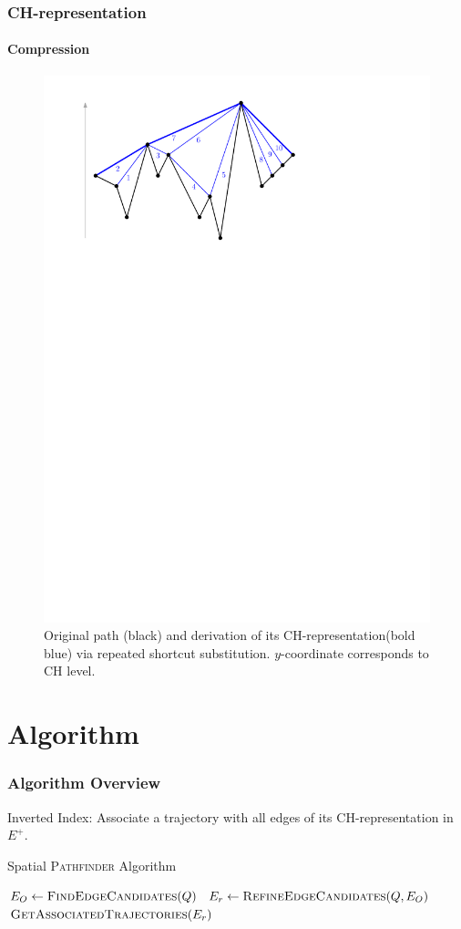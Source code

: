 \documentclass[10pt, t,
aspectratio=169,%
]{beamer}
\newcommand{\pathfinder}{\textsc{Pathfinder}\xspace}
\newcommand{\findEdgeCandidates}{FindEdgeCandidates\xspace}
\newcommand{\refineEdgeCandidates}{RefineEdgeCandidates\xspace}
\newcommand{\getAssociatedTrajectories}{GetAssociatedTrajectories\xspace}
\newcommand{\chrep}{CH-representation\xspace}
\begin{document}
\begin{frame}
	\frametitle{\chrep}
	\framesubtitle{Compression}
	\begin{figure}
		\caption{Original path (black) and derivation of its \chrep (bold blue) via repeated shortcut substitution. $y$-coordinate corresponds to CH level.}
		\includegraphics[width=.76\columnwidth]{images/toch}
	\end{figure}
\end{frame}

\section{Algorithm}

\begin{frame}
	\frametitle{Algorithm Overview}
	Inverted Index: Associate a trajectory with all edges of its \chrep in $E^+$. \pause
	\begin{algorithm}[H]
		\renewcommand{\thealgorithm}{}
		{\small
			\caption{Spatial \pathfinder Algorithm}
			\begin{algorithmic}[1]
				 \pause
				\State $E_O \gets \Call{\findEdgeCandidates}{Q}$ \label{line:edge_revrieval} \pause
				\State $E_r \gets \Call{\refineEdgeCandidates}{Q, E_O}$ \pause
				\State \Return $\Call{\getAssociatedTrajectories}{E_r}$
				\EndProcedure
			\end{algorithmic}
			\label{alg:spatial_pathfinder}
		}
	\end{algorithm}
\end{frame}
\end{document}
